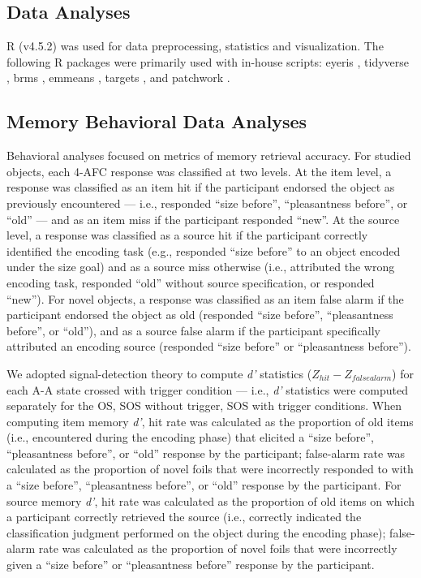 \subsection{Data Analyses}

R (v4.5.2) was used for data preprocessing, statistics and visualization. The following R packages were primarily used with in-house scripts: eyeris \parencite{schwartz2025eyeris,schwartz2025eyerispaper}, tidyverse \parencite{wickham2019welcome}, brms \parencite{burkner2017brms}, emmeans \parencite{lenth2019emmeans}, targets \parencite{landau2021targets}, and patchwork \parencite{pedersen2025patchwork}.

\subsection{Memory Behavioral Data Analyses}

Behavioral analyses focused on metrics of memory retrieval accuracy. For studied objects, each 4-AFC response was classified at two levels. At the item level, a response was classified as an item hit if the participant endorsed the object as previously encountered — i.e., responded ``size before'', ``pleasantness before'', or ``old'' — and as an item miss if the participant responded ``new''. At the source level, a response was classified as a source hit if the participant correctly identified the encoding task (e.g., responded ``size before'' to an object encoded under the size goal) and as a source miss otherwise (i.e., attributed the wrong encoding task, responded ``old'' without source specification, or responded ``new''). For novel objects, a response was classified as an item false alarm if the participant endorsed the object as old (responded ``size before'', ``pleasantness before'', or ``old''), and as a source false alarm if the participant specifically attributed an encoding source (responded ``size before'' or ``pleasantness before''). 

We adopted signal-detection theory \parencite{green1988signal} to compute \textit{d'} statistics ($Z_{hit} - Z_{falsealarm}$) for each A-A state crossed with trigger condition –– i.e., \textit{d'} statistics were computed separately for the OS, SOS without trigger, SOS with trigger conditions. When computing item memory \textit{d'}, hit rate was calculated as the proportion of old items (i.e., encountered during the encoding phase) that elicited a ``size before'', ``pleasantness before'', or ``old'' response by the participant; false-alarm rate was calculated as the proportion of novel foils that were incorrectly responded to with a ``size before'', ``pleasantness before'', or ``old'' response by the participant. For source memory \textit{d'}, hit rate was calculated as the proportion of old items on which a participant correctly retrieved the source (i.e., correctly indicated the classification judgment performed on the object during the encoding phase); false-alarm rate was calculated as the proportion of novel foils that were incorrectly given a ``size before'' or ``pleasantness before'' response by the participant. 


